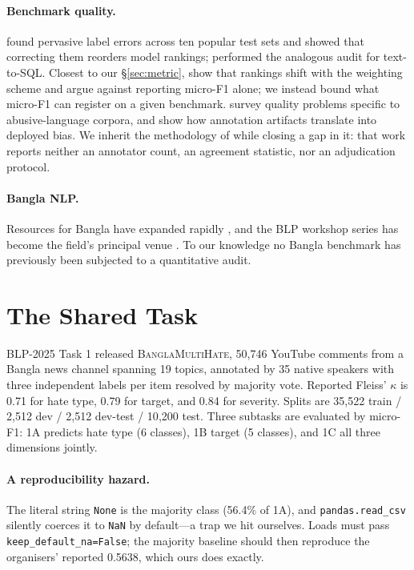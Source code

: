\documentclass[11pt]{article}
\begin{document}
\paragraph{Benchmark quality.} \citet{northcutt2021labelerrors} found pervasive
label errors across ten popular test sets and showed that correcting them
reorders model rankings; \citet{jin2026broken} performed the analogous audit for
text-to-SQL. Closest to our \S\ref{sec:metric},
\citet{harbecke2022micro} show that rankings shift with the weighting scheme and
argue against reporting micro-F1 alone; we instead bound what micro-F1 can
register on a given benchmark. \citet{vidgen2020directions} survey quality problems specific to
abusive-language corpora, and \citet{sap2019racialbias} show how annotation
artifacts translate into deployed bias. We inherit the methodology of
\citet{jin2026broken} while closing a gap in it: that work reports neither an
annotator count, an agreement statistic, nor an adjudication protocol.

\paragraph{Bangla NLP.} Resources for Bangla have expanded rapidly
\citep{bhattacharjee2022banglabert}, and the BLP workshop series has become the
field's principal venue \citep{hasan2025blptask1,raihan2025blptask2}. To our
knowledge no Bangla benchmark has previously been subjected to a quantitative
audit.

\section{The Shared Task}
\label{sec:task}

BLP-2025 Task 1 \citep{hasan2025blptask1} released \textsc{BanglaMultiHate},
50{,}746 YouTube comments from a Bangla news channel spanning 19 topics,
annotated by 35 native speakers with three independent labels per item resolved
by majority vote. Reported Fleiss' $\kappa$ \citep{fleiss1971} is 0.71 for hate
type, 0.79 for target, and 0.84 for severity. Splits are 35{,}522 train /
2{,}512 dev / 2{,}512 dev-test / 10{,}200 test. Three subtasks are evaluated by
micro-F1: 1A predicts hate type (6 classes), 1B target (5 classes), and 1C all
three dimensions jointly.

\paragraph{A reproducibility hazard.} The literal string \texttt{None} is the
majority class (56.4\% of 1A), and \texttt{pandas.read\_csv} silently coerces it
to \texttt{NaN} by default---a trap we hit ourselves. Loads must pass
\texttt{keep\_default\_na=False}; the majority baseline should then reproduce the
organisers' reported 0.5638, which ours does exactly.
\end{document}
